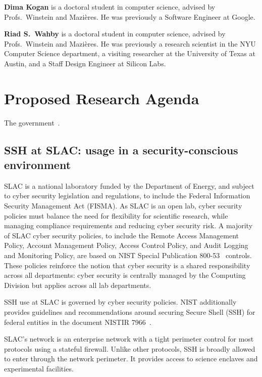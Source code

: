 \documentclass[11pt]{article}
\newcommand{\slim}{\vspace{\baselineskip}}
\begin{document}
\noindent \textbf{Dima Kogan} is a doctoral student in computer science,
advised by Profs.~Winstein and Mazi\`{e}res. He was previously a Software
Engineer at Google.

\slim

\noindent \textbf{Riad S.~Wahby} is a doctoral student in computer science,
advised by Profs.~Winstein and Mazi\`{e}res. He was previously a
research scientist in the NYU Computer Science department, a
visiting researcher at the University of Texas at Austin, and a Staff
Design Engineer at Silicon Labs.

\section{Proposed Research Agenda}

The government~\cite{cyberframework, nistSSH, trumpeo}.

\subsection{SSH at SLAC: usage in a security-conscious environment}

SLAC is a national laboratory funded by the Department of Energy, and
subject to cyber security legislation and regulations, to include the
Federal Information Security Management Act (FISMA). As SLAC is an
open lab, cyber security policies must balance the need for
flexibility for scientific research, while managing compliance
requirements and reducing cyber security risk. A majority of SLAC
cyber security policies, to include the Remote Access Management
Policy, Account Management Policy, Access Control Policy, and Audit
Logging and Monitoring Policy, are based on NIST Special Publication
800-53~\cite{nist80053} controls. These policies reinforce the notion
that cyber security is a shared responsibility across all departments:
cyber security is centrally managed by the Computing Division but
applies across all lab departments.

SSH use at SLAC is governed by cyber security policies. NIST
additionally provides guidelines and recommendations around securing
Secure Shell (SSH) for federal entities in the document NISTIR
7966~\cite{nistSSH}.

SLAC's network is an enterprise network with a tight perimeter control
for most protocols using a stateful firewall. Unlike other protocols,
SSH is broadly allowed to enter through the network perimeter. It
provides access to science enclaves and experimental facilities.
\end{document}
